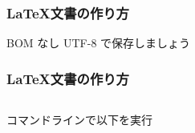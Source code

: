 
\begin{frame}[fragile]
	\frametitle{\LaTeX 文書の作り方}
	

	BOM なし UTF-8 で保存しましょう
\end{frame}

\begin{frame}
	\frametitle{\LaTeX 文書の作り方}
	\begin{columns}[c]
		\begin{column}{0.5\textwidth}
			コマンドラインで以下を実行


		\end{column}
		\begin{column}{0.4\textwidth}
		\end{column}
	\end{columns}
\end{frame}

